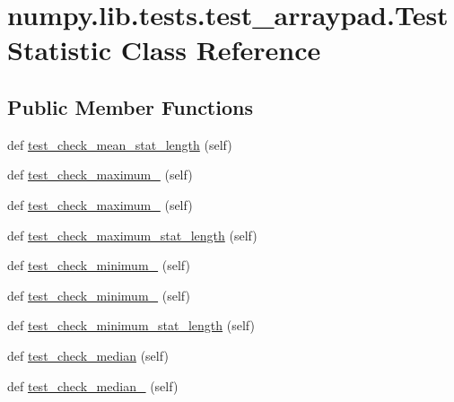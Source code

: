 \hypertarget{classnumpy_1_1lib_1_1tests_1_1test__arraypad_1_1TestStatistic}{}\section{numpy.\+lib.\+tests.\+test\+\_\+arraypad.\+Test\+Statistic Class Reference}
\label{classnumpy_1_1lib_1_1tests_1_1test__arraypad_1_1TestStatistic}
\subsection*{Public Member Functions}
\begin{DoxyCompactItemize}
\item 
def \hyperlink{classnumpy_1_1lib_1_1tests_1_1test__arraypad_1_1TestStatistic_affe4b205cc2b9cc980e58c17ac5f61da}{test\+\_\+check\+\_\+mean\+\_\+stat\+\_\+length} (self)
\item 
def \hyperlink{classnumpy_1_1lib_1_1tests_1_1test__arraypad_1_1TestStatistic_a37ce8fd7f1e381b62a5f9db13a215494}{test\+\_\+check\+\_\+maximum\+\_} (self)
\item 
def \hyperlink{classnumpy_1_1lib_1_1tests_1_1test__arraypad_1_1TestStatistic_a54eabca6d79987d1331dd8166359e25e}{test\+\_\+check\+\_\+maximum\+\_} (self)
\item 
def \hyperlink{classnumpy_1_1lib_1_1tests_1_1test__arraypad_1_1TestStatistic_a215ebd80059dc727472c12bbe2370510}{test\+\_\+check\+\_\+maximum\+\_\+stat\+\_\+length} (self)
\item 
def \hyperlink{classnumpy_1_1lib_1_1tests_1_1test__arraypad_1_1TestStatistic_ae255d76a3094a9785f2d9d9f39754f18}{test\+\_\+check\+\_\+minimum\+\_} (self)
\item 
def \hyperlink{classnumpy_1_1lib_1_1tests_1_1test__arraypad_1_1TestStatistic_a489890c5f00f1c1fbf836d6359c6c714}{test\+\_\+check\+\_\+minimum\+\_} (self)
\item 
def \hyperlink{classnumpy_1_1lib_1_1tests_1_1test__arraypad_1_1TestStatistic_a66dda48c6c3313059f151bffe980364b}{test\+\_\+check\+\_\+minimum\+\_\+stat\+\_\+length} (self)
\item 
def \hyperlink{classnumpy_1_1lib_1_1tests_1_1test__arraypad_1_1TestStatistic_a37e10799659b02e63757ae61f758c8a2}{test\+\_\+check\+\_\+median} (self)
\item 
def \hyperlink{classnumpy_1_1lib_1_1tests_1_1test__arraypad_1_1TestStatistic_ade621f6655b0d81f74bf0127b5356d52}{test\+\_\+check\+\_\+median\+\_} (self)

\end{DoxyCompactItemize}
